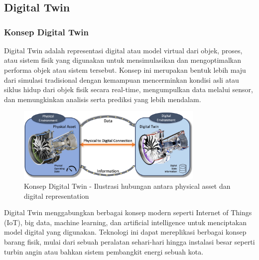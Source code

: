 \chapter{\babTiga}

\section{Digital Twin}

\subsection{Konsep Digital Twin}

Digital Twin adalah representasi digital atau model virtual dari objek, proses, atau sistem fisik yang digunakan untuk mensimulasikan dan mengoptimalkan performa objek atau sistem tersebut. Konsep ini merupakan bentuk lebih maju dari simulasi tradisional dengan kemampuan mencerminkan kondisi asli atau siklus hidup dari objek fisik secara real-time, mengumpulkan data melalui sensor, dan memungkinkan analisis serta prediksi yang lebih mendalam.

\begin{figure}[htbp]
    \centering
    \includegraphics[width=0.8\textwidth]{assets/pics/bab3_1.png}
    \caption{Konsep Digital Twin - Ilustrasi hubungan antara physical asset dan digital representation}
    \label{fig:digital_twin_concept}
\end{figure}

Digital Twin menggabungkan berbagai konsep modern seperti Internet of Things (IoT), big data, machine learning, dan artificial intelligence untuk menciptakan model digital yang digunakan. Teknologi ini dapat mereplikasi berbagai konsep barang fisik, mulai dari sebuah peralatan sehari-hari hingga instalasi besar seperti turbin angin atau bahkan sistem pembangkit energi sebuah kota.

